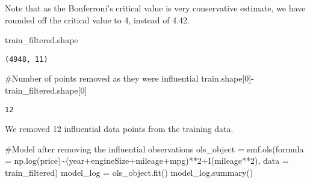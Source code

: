 \documentclass[
  letterpaper,
  DIV=11,
  numbers=noendperiod]{scrreprt}
\newenvironment{Shaded}{\begin{snugshade}}{\end{snugshade}}
\newcommand{\CommentTok}[1]{\textcolor[rgb]{0.37,0.37,0.37}{#1}}
\newcommand{\DecValTok}[1]{\textcolor[rgb]{0.68,0.00,0.00}{#1}}
\newcommand{\NormalTok}[1]{\textcolor[rgb]{0.00,0.23,0.31}{#1}}
\newcommand{\OperatorTok}[1]{\textcolor[rgb]{0.37,0.37,0.37}{#1}}
\newcommand{\StringTok}[1]{\textcolor[rgb]{0.13,0.47,0.30}{#1}}
\begin{document}
Note that as the Bonferroni's critical value is very conservative
estimate, we have rounded off the critical value to 4, instead of 4.42.

\begin{Shaded}
\begin{Highlighting}[]
\NormalTok{train\_filtered.shape}
\end{Highlighting}
\end{Shaded}

\begin{verbatim}
(4948, 11)
\end{verbatim}

\begin{Shaded}
\begin{Highlighting}[]
\CommentTok{\#Number of points removed as they were influential}
\NormalTok{train.shape[}\DecValTok{0}\NormalTok{]}\OperatorTok{{-}}\NormalTok{train\_filtered.shape[}\DecValTok{0}\NormalTok{]}
\end{Highlighting}
\end{Shaded}

\begin{verbatim}
12
\end{verbatim}

We removed 12 influential data points from the training data.

\begin{Shaded}
\begin{Highlighting}[]
\CommentTok{\#Model after removing the influential observations}
\NormalTok{ols\_object }\OperatorTok{=}\NormalTok{ smf.ols(formula }\OperatorTok{=} \StringTok{\textquotesingle{}np.log(price)\textasciitilde{}(year+engineSize+mileage+mpg)**2+I(mileage**2)\textquotesingle{}}\NormalTok{, data }\OperatorTok{=}\NormalTok{ train\_filtered)}
\NormalTok{model\_log }\OperatorTok{=}\NormalTok{ ols\_object.fit()}
\NormalTok{model\_log.summary()}
\end{Highlighting}
\end{Shaded}
\end{document}
